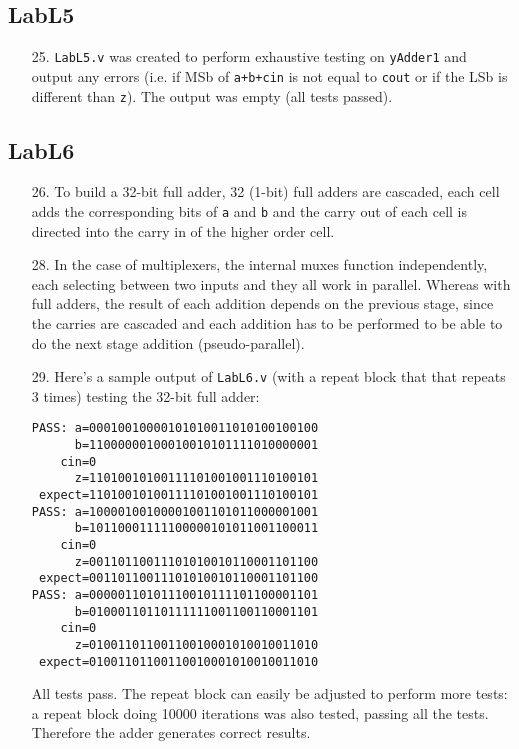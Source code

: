 \documentclass{article}
\begin{document}
\subsection{LabL5}
\begin{enumerate}
\item[25. ] \verb$LabL5.v$ was created to perform exhaustive testing on \verb$yAdder1$ and output any errors (i.e. if MSb of \verb$a+b+cin$ is not equal to \verb$cout$ or if the LSb is different than \verb$z$). The output was empty (all tests passed).
\end{enumerate}

\subsection{LabL6}
\begin{enumerate}
\item[26. ] To build a 32-bit full adder, 32 (1-bit) full adders are cascaded, each cell adds the corresponding bits of \verb$a$ and \verb$b$ and the carry out of each cell is directed into the carry in of the higher order cell.

\item[28. ] In the case of multiplexers, the internal muxes function independently, each selecting between two inputs and they all work in parallel. Whereas with full adders, the result of each addition depends on the previous stage, since the carries are cascaded and each addition has to be performed to be able to do the next stage addition (pseudo-parallel).

\item[29. ] Here's a sample output of \verb$LabL6.v$ (with a repeat block that that repeats 3 times) testing the 32-bit full adder:
\begin{verbatim}
PASS: a=00010010000101010011010100100100
      b=11000000100010010101111010000001
    cin=0
      z=11010010100111101001001110100101
 expect=11010010100111101001001110100101
PASS: a=10000100100001001101011000001001
      b=10110001111100000101011001100011
    cin=0
      z=00110110011101010010110001101100
 expect=00110110011101010010110001101100
PASS: a=00000110101110010111101100001101
      b=01000110110111111001100110001101
    cin=0
      z=01001101100110010001010010011010
 expect=01001101100110010001010010011010
\end{verbatim}
  All tests pass. The repeat block can easily be adjusted to perform more tests: a repeat block doing 10000 iterations was also tested, passing all the tests. Therefore the adder generates correct results.
\end{enumerate}
\end{document}
